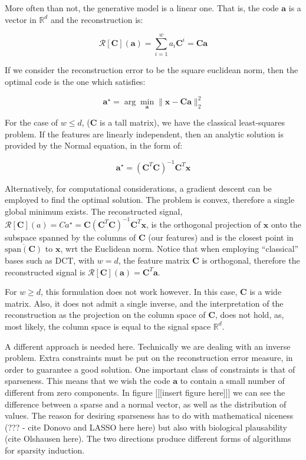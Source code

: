 \documentclass[12pt,a4paper,oneside,english]{UPBThesis}
\newcommand{\hcsignalspace}{\mathbb{R}^d}
\begin{document}
More often than not, the generative model is a linear one. That is, the code $\textbf{a}$ is a vector in $\hcsignalspace$ and the reconstruction is:

\begin{equation*}
\mathcal{R}[\textbf{C}](\textbf{a}) = \sum_{i=1}^{w}{a_i \textbf{C}^i} = \textbf{C}\textbf{a}
\end{equation*}

If we consider the reconstruction error to be the square euclidean norm, then the optimal code is the one which satisfies:

\begin{equation}
\textbf{a}^{\star} = \arg\min_{\textbf{a}} \| \textbf{x} - \textbf{C}\textbf{a} \|_2^2
\end{equation}

For the case of $w \leq d$, ($\textbf{C}$ is a tall matrix), we have the classical least-squares problem. If the features are linearly independent, then an analytic solution is provided by the Normal equation, in the form of:

\begin{equation}
\textbf{a}^{\star} = (\textbf{C}^T\textbf{C})^{-1}\textbf{C}^T\textbf{x}
\end{equation}

Alternatively, for computational considerations, a gradient descent can be employed to find the optimal solution. The problem is convex, therefore a single global minimum exists. The reconstructed signal, $\mathcal{R}[\textbf{C}](a) = Ca^{\star} = \textbf{C}(\textbf{C}^T\textbf{C})^{-1}\textbf{C}^T\textbf{x}$, is the orthogonal projection of $\textbf{x}$ onto the subspace spanned by the columns of $\textbf{C}$ (our features) and is the closest point in $\overline{\text{span}(\textbf{C})}$ to $\textbf{x}$, wrt the Euclidean norm. Notice that when employing ``classical'' bases such as DCT, with $w = d$, the feature matrix $\textbf{C}$ is orthogonal, therefore the reconstructed signal is $\mathcal{R}[\textbf{C}](\textbf{a}) = \textbf{C}^T\textbf{a}$.

For $w \ge d$, this formulation does not work however. In this case, $\textbf{C}$ is a wide matrix. Also, it does not admit a single inverse, and the interpretation of the reconstruction as the projection on the column space of $\textbf{C}$, does not hold, as, most likely, the column space is equal to the signal space $\hcsignalspace$.

A different approach is needed here. Technically we are dealing with an inverse problem. Extra constraints must be put on the reconstruction error measure, in order to guarantee a good solution. One important class of constraints is that of sparseness. This means that we wish the code $\textbf{a}$ to contain a small number of different from zero components. In figure [[[insert figure here]]] we can see the difference between a sparse and a normal vector, as well as the distribution of values. The reason for desiring sparseness has to do with mathematical niceness (??? - cite Donovo and LASSO here here) but also with biological plausability (cite Olshausen here). The two directions produce different forms of algorithms for sparsity induction.
\end{document}
